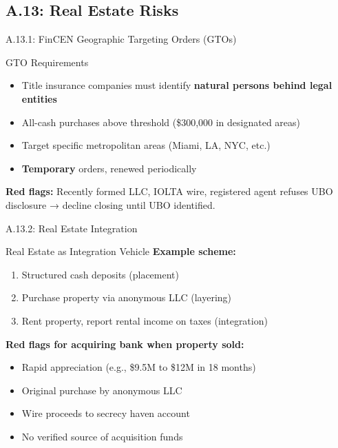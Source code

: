 \documentclass{beamer}
\begin{document}
	\subsection{A.13: Real Estate Risks}
	
	\begin{frame}{A.13.1: FinCEN Geographic Targeting Orders (GTOs)}
		\begin{block}{GTO Requirements}
			\begin{itemize}
				\item Title insurance companies must identify \textbf{natural persons behind legal entities}
				\item All-cash purchases above threshold (\$300,000 in designated areas)
				\item Target specific metropolitan areas (Miami, LA, NYC, etc.)
				\item \textbf{Temporary} orders, renewed periodically
			\end{itemize}
		\end{block}
		\textbf{Red flags:} Recently formed LLC, IOLTA wire, registered agent refuses UBO disclosure → decline closing until UBO identified.
	\end{frame}
	
	\begin{frame}{A.13.2: Real Estate Integration}
		\begin{block}{Real Estate as Integration Vehicle}
			\textbf{Example scheme:}
			\begin{enumerate}
				\item Structured cash deposits (placement)
				\item Purchase property via anonymous LLC (layering)
				\item Rent property, report rental income on taxes (integration)
			\end{enumerate}
		\end{block}
		\textbf{Red flags for acquiring bank when property sold:}
		\begin{itemize}
			\item Rapid appreciation (e.g., \$9.5M to \$12M in 18 months)
			\item Original purchase by anonymous LLC
			\item Wire proceeds to secrecy haven account
			\item No verified source of acquisition funds
		\end{itemize}
	\end{frame}
	
\end{document}
